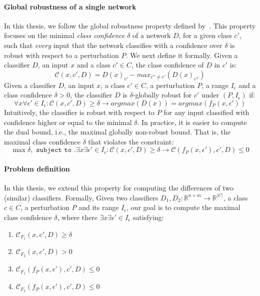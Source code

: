 \paragraph{Global robustness of a single network}
In this thesis, we follow the global robustness property defined by~\cite{DECISIONBOUND}.
This property focuses on the minimal \emph{class confidence} $\delta$ of a network $D$, for a given class $c'$, such that \emph{every} input that the network classifies with a confidence over $\delta$ is robust with respect to a perturbation $P$. We next define it formally.
Given a classifier $D$, an input $x$ and a class $c'\in{C}$, the class confidence of $D$ in $c'$ is:
$$\mathcal{C}(x,c',D)=D(x)_{c'}-max_{c''\ne c'}(D(x)_{c''})$$
Given a classifier $D$, an input $x$, a class $c'\in{C}$, a perturbation $P$, a range $I_\epsilon$ and a class confidence $\delta>0$, the classifier $D$ is $\delta$-globally robust for $c'$ under $(P,I_\epsilon)$ if:\\
$$\forall{x}\forall{\epsilon'}\in{I_\epsilon}:    \mathcal{C}(x,c',D) \geq \delta \rightarrow argmax(D(x)) = argmax(f_P(x,\epsilon')) $$
Intuitively, the classifier is robust with respect to $P$ for any input classified with confidence higher or equal to the minimal $\delta$. In practice, it is easier to compute the dual bound, i.e., the maximal globally non-robust bound. That is, the maximal class confidence $\delta$ that violates the constraint:
$$\max{\delta}, \texttt{ subject to }. \exists{x}\exists{\epsilon'}\in{I_\epsilon}: \mathcal{C}(x,c',D) \geq \delta \rightarrow \mathcal{C}(f_P(x,\epsilon'),c',D)\leq 0$$

\paragraph{Problem definition} 
In this thesis, we extend this property for computing the differences of two (similar) classifiers. Formally,
Given two classifiers $D_1,D_2: \mathbb{R}^{n \times m} \rightarrow {\mathbb{R}}^{|C|}$, a class $c\in{C}$, a perturbation $P$ and its range $I_\epsilon$, our goal is to compute the maximal class confidence $\delta$, where there $\exists{x}\exists{\epsilon'}\in{I_\epsilon}$ satisfying:

\begin{enumerate}
    \item $\mathcal{C}_{F_1}(x,c',D) \geq \delta$
    \item $\mathcal{C}_{F_2}(x,c',D) > 0$
    \item $\mathcal{C}_{F_1}(f_P(x,\epsilon'),c',D)\leq 0$
    \item $\mathcal{C}_{F_2}(f_P(x,\epsilon'),c',D)\leq 0$
\end{enumerate} 